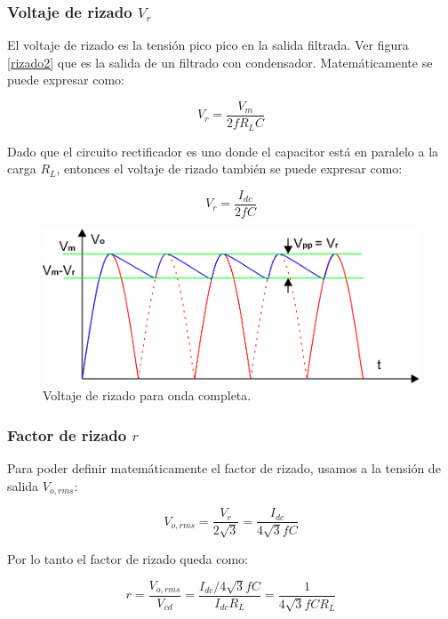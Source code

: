 \documentclass[a4paper]{IEEEtran} %
\begin{document}
\subsubsection{Voltaje de rizado $V_r$}

El voltaje de rizado es la tensión pico pico en la salida filtrada. Ver figura \eqref{rizado2} que es la salida de un filtrado con condensador. Matemáticamente se puede expresar como:

\begin{equation}
	V_r = \frac{V_m}{2fR_L C}
\end{equation}

Dado que el circuito rectificador es uno donde el capacitor está en paralelo a la carga $R_L$, entonces el voltaje de rizado también se puede expresar como:

\begin{equation}
	V_r = \frac{I_{dc}}{2fC}
\end{equation}

\begin{figure}[h!]
	\centering
	\includegraphics[scale=1]{IMAGENES/rizado2}
	\caption{Voltaje de rizado para onda completa.}
	\label{rizado2}
\end{figure}



\subsubsection{Factor de rizado $r$}

Para poder definir matemáticamente el factor de rizado, usamos a la tensión de salida $V_{o,rms}$:

\begin{equation}
	V_{o,rms} = \frac{V_r}{2 \sqrt{3}} = \frac{I_{dc}}{4 \sqrt{3} fC}
\end{equation}

Por lo tanto el factor de rizado queda como:

\begin{equation}
	\label{frizado_completa}
	r = \frac{V_{o,rms}}{V_{cd}} = \frac{I_{dc}/4\sqrt{3} fC}{I_{dc} R_L} = \frac{1}{4 \sqrt{3} f C R_L}
\end{equation}
\end{document}
